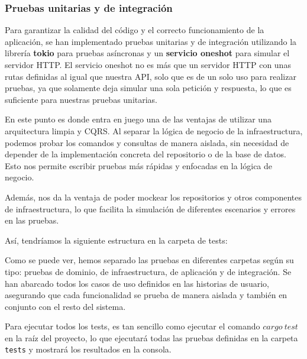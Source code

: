 \subsubsection{Pruebas unitarias y de integración}

Para garantizar la calidad del código y el correcto funcionamiento de la aplicación, se han implementado pruebas unitarias y de integración utilizando la librería \textbf{tokio} para pruebas asíncronas y un \textbf{servicio oneshot} para simular el servidor HTTP.
El servicio oneshot no es más que un servidor HTTP con unas rutas definidas al igual que nuestra API, solo que es de un solo uso para realizar pruebas, ya que solamente deja simular una sola petición y respuesta, lo que es suficiente para nuestras pruebas unitarias.

En este punto es donde entra en juego una de las ventajas de utilizar una arquitectura limpia y CQRS.
Al separar la lógica de negocio de la infraestructura, podemos probar los comandos y consultas de manera aislada, sin necesidad de depender de la implementación concreta del repositorio o de la base de datos. Esto nos permite escribir pruebas más rápidas y enfocadas en la lógica de negocio.

Además, nos da la ventaja de poder \gls{mockear} los repositorios y otros componentes de infraestructura, lo que facilita la simulación de diferentes escenarios y errores en las pruebas.

Así, tendríamos la siguiente estructura en la carpeta de tests:


Como se puede ver, hemos separado las pruebas en diferentes carpetas según su tipo: pruebas de dominio, de infraestructura, de aplicación y de integración.
Se han abarcado todos los casos de uso definidos en las historias de usuario, asegurando que cada funcionalidad se prueba de manera aislada y también en conjunto con el resto del sistema.

Para ejecutar todos los tests, es tan sencillo como ejecutar el comando $cargo\ test$ en la raíz del proyecto, lo que ejecutará todas las pruebas definidas en la carpeta \texttt{tests} y mostrará los resultados en la consola.


